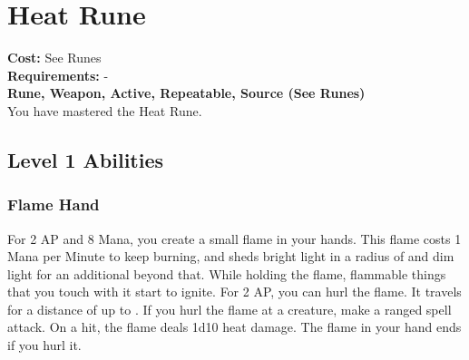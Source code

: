 \section{Heat Rune}\label{rune:heat}
\textbf{Cost:} See Runes\\
\textbf{Requirements:} -\\
\textbf{Rune, Weapon, Active, Repeatable, Source (See Runes)}\\
You have mastered the Heat Rune.

\subsection{Level 1 Abilities}

\subsubsection{Flame Hand}
For 2 AP and 8 Mana, you create a small flame in your hands.
This flame costs 1 Mana per Minute to keep burning, and sheds bright light in a radius of  and dim light for an additional  beyond that.
While holding the flame, flammable things that you touch with it start to ignite.
For 2 AP, you can hurl the flame.
It travels for a distance of up to .
If you hurl the flame at a creature, make a ranged spell attack.
On a hit, the flame deals 1d10 heat damage.
The flame in your hand ends if you hurl it.